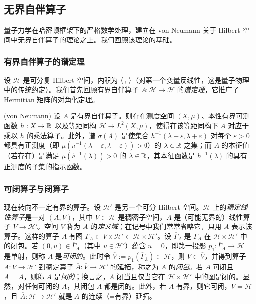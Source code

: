 \subsection{无界自伴算子}

量子力学在哈密顿框架下的严格数学处理，建立在 von Neumann 关于 Hilbert 空间中无界自伴算子的理论之上。我们回顾该理论的基础。

\subsubsection{有界自伴算子的谱定理}
设 $\mathcal H$ 是可分复 Hilbert 空间，内积为 $\la,\ra$（对第一个变量反线性，这是量子物理中的传统约定）。我们首先回顾有界自伴算子 $A: \mathcal H\to \mathcal H$ 的\emph{谱定理}，它推广了 Hermitian 矩阵的对角化定理。

\begin{theorem}\label{specthe} (von Neumann) 设 $A$ 是有界自伴算子。则存在测度空间 $(X,\mu)$、本性有界可测函数 $h: X\to \Bbb R$ 以及等距同构 $\mathcal H\to L^2(X,\mu)$，使得在该等距同构下 $A$ 对应于乘以 $h$ 的乘法算子。此外，谱 $\sigma(A)$ 是使集合 $h^{-1}(\lambda-\varepsilon,\lambda+\varepsilon)$ 对每个 $\varepsilon>0$ 都具有正测度（即 $\mu(h^{-1}(\lambda-\varepsilon,\lambda+\varepsilon))>0$）的 $\lambda\in \Bbb R$ 之集；而 $A$ 的本征值（若存在）是满足 $\mu(h^{-1}(\lambda))>0$ 的 $\lambda\in \Bbb R$，其本征函数是 $h^{-1}(\lambda)$ 的具有正测度的子集的指示函数。
\end{theorem}

\subsubsection{可闭算子与闭算子}
现在转向不一定有界的算子。设 $\mathcal H'$ 是另一个可分 Hilbert 空间。$\mathcal H$ 上的\emph{稠定线性算子}是一对 $(A,V)$，其中 $V\subset \mathcal H$ 是稠密子空间，$A$ 是（可能无界的）线性算子 $V\to \mathcal H'$。空间 $V$ 称为 $A$ 的\emph{定义域}；在记号中我们常常省略它，只用 $A$ 表示该算子。这样的算子 $A$ 有图 $\Gamma_A\subset V\times \mathcal H'\subset \mathcal H\times \mathcal H'$。设 $\overline \Gamma_A$ 是 $\Gamma_A$ 在 $\mathcal H\times \mathcal H'$ 中的闭包。若 $(0,u)\in \overline \Gamma_A$（其中 $u\in \mathcal H'$）蕴含 $u=0$，即第一投影 $p_1:\overline\Gamma_A\to \mathcal H$ 是单射，则称 $A$ 是\emph{可闭的}。此时令 $\overline V:=p_1(\overline \Gamma_A)\subset \mathcal H$，则 $V\subset \overline V$，并得到算子 $A: V\to \mathcal H'$ 到稠定算子 $\overline A: \overline V\to \mathcal H'$ 的延拓，称之为 $A$ 的\emph{闭包}。若 $A$ 可闭且 $\overline A=A$，则称 $A$ 是\emph{闭的}；换言之，$A$ 闭当且仅当它在 $\mathcal H\times \mathcal H'$ 中的图是闭的。显然，对任何可闭的 $A$，其闭包 $\overline A$ 都是闭的。此外，若 $A$ 有界，则它可闭，$\overline V=\mathcal H$，且 $\overline A: \mathcal H\to \mathcal H'$ 就是 $A$ 的连续（=有界）延拓。

